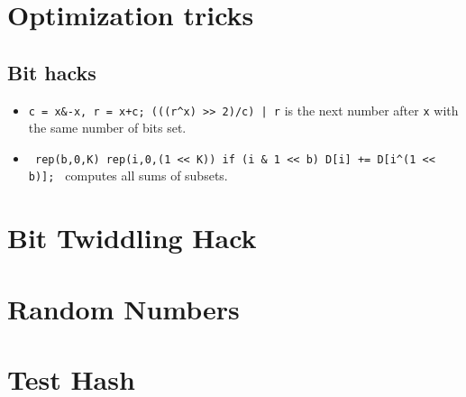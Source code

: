\section{Optimization tricks}
	\subsection{Bit hacks}
		\begin{itemize}
			\item \texttt{c = x\&-x, r = x+c; (((r\^{}x) >> 2)/c) | r} is the next number after \texttt{x} with the same number of bits set.
			\item \texttt{ rep(b,0,K) rep(i,0,(1 << K)) if (i \& 1 << b) D[i] += D[i\^{}(1 << b)]; } computes all sums of subsets.
		\end{itemize}
	
	
\section {Bit Twiddling Hack}
\section {Random Numbers}
\section {Test Hash}
